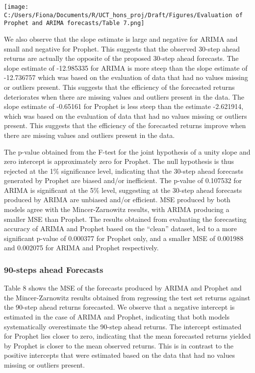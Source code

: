 \documentclass[12pt,a4paper]{article}
\numberwithin{equation}{section}
\numberwithin{figure}{section}
\numberwithin{table}{section}
\let\origfigure\figure
\let\endorigfigure\endfigure
\renewenvironment{figure}[1][2] {
    \expandafter\origfigure\expandafter[H]
} {
    \endorigfigure
}
\begin{document}
\begin{figure}[htbp]
\centering
\texttt{[image: C:/Users/Fiona/Documents/R/UCT\_hons\_proj/Draft/Figures/Evaluation of Prophet and ARIMA forecasts/Table 7.png]}
\caption{Mincer-Zarnowitz results for 30-step ahead forecasts}
\end{figure}

We also observe that the slope estimate is large and negative for ARIMA
and small and negative for Prophet. This suggests that the observed
30-step ahead returns are actually the opposite of the proposed 30-step
ahead forecasts. The slope estimate of -12.985335 for ARIMA is more
steep than the slope estimate of -12.736757 which was based on the
evaluation of data that had no values missing or outliers present. This
suggests that the efficiency of the forecasted returns deteriorates when
there are missing values and outliers present in the data. The slope
estimate of -0.65161 for Prophet is less steep than the estimate
-2.621914, which was based on the evaluation of data that had no values
missing or outliers present. This suggests that the efficiency of the
forecasted returns improve when there are missing values and outliers
present in the data.

The p-value obtained from the F-test for the joint hypothesis of a unity
slope and zero intercept is approximately zero for Prophet. The null
hypothesis is thus rejected at the 1\% significance level, indicating
that the 30-step ahead forecasts generated by Prophet are biased and/or
inefficient. The p-value of 0.107532 for ARIMA is significant at the 5\%
level, suggesting at the 30-step ahead forecasts produced by ARIMA are
unbiased and/or efficient. MSE produced by both models agree with the
Mincer-Zarnowitz results, with ARIMA producing a smaller MSE than
Prophet. The results obtained from evaluating the forecasting accuracy
of ARIMA and Prophet based on the ``clean'' dataset, led to a more
significant p-value of 0.000377 for Prophet only, and a smaller MSE of
0.001988 and 0.002075 for ARIMA and Prophet respectively.

\subsubsection{90-steps ahead Forecasts}\label{steps-ahead-forecasts-3}

Table 8 shows the MSE of the forecasts produced by ARIMA and Prophet and
the Mincer-Zarnowitz results obtained from regressing the test set
returns against the 90-step ahead returns forecasted. We observe that a
negative intercept is estimated in the case of ARIMA and Prophet,
indicating that both models systematically overestimate the 90-step
ahead returns. The intercept estimated for Prophet lies closer to zero,
indicating that the mean forecasted returns yielded by Prophet is closer
to the mean observed returns. This is in contrast to the positive
intercepts that were estimated based on the data that had no values
missing or outliers present.
\end{document}
